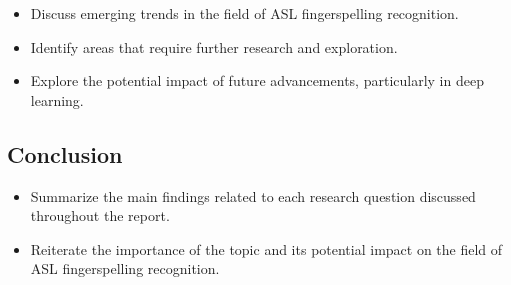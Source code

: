\begin{itemize}
    \item Discuss emerging trends in the field of ASL fingerspelling recognition.
    \item Identify areas that require further research and exploration.
    \item Explore the potential impact of future advancements, particularly in deep learning.
\end{itemize}

\subsection{Conclusion}

\begin{itemize}
    \item Summarize the main findings related to each research question discussed throughout the report.
    \item Reiterate the importance of the topic and its potential impact on the field of ASL fingerspelling recognition.
\end{itemize}